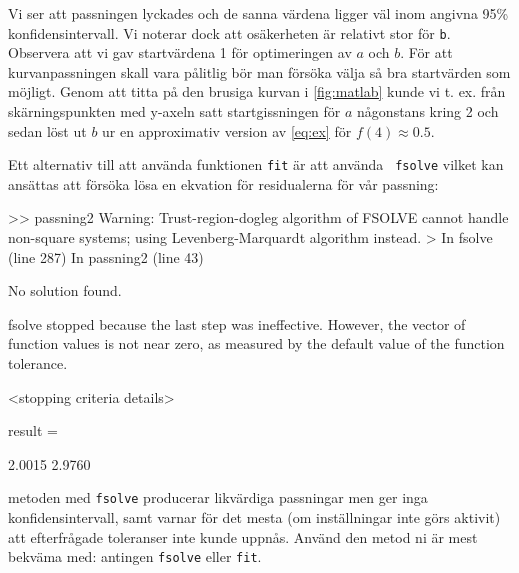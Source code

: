 Vi ser att passningen lyckades och de sanna värdena ligger väl inom
angivna 95\%  konfidensintervall. Vi noterar dock att osäkerheten är
relativt stor för {\tt b}. Observera att vi gav startvärdena 1 för
optimeringen av $a$ och $b$. För att kurvanpassningen skall vara pålitlig
bör man försöka välja så bra startvärden som möjligt. Genom att titta på
den brusiga kurvan i \cref{fig:matlab} kunde vi t. ex. från
skärningspunkten med y-axeln satt startgissningen för $a$ någonstans
kring 2 och sedan löst ut $b$ ur en approximativ version av \cref{eq:ex} för
$f(4) \approx 0.5$.

Ett alternativ till att använda funktionen {\tt fit} är att använda {\tt
  fsolve} vilket kan ansättas att försöka lösa en ekvation för
residualerna för vår passning:


\begin{terminaloutput}
>> passning2
Warning: Trust-region-dogleg algorithm of FSOLVE cannot handle non-square systems; using Levenberg-Marquardt algorithm instead. 
> In fsolve (line 287)
  In passning2 (line 43) 

No solution found.

fsolve stopped because the last step was ineffective. However, the vector of function
values is not near zero, as measured by the default value of the function tolerance. 

<stopping criteria details>


result =

    2.0015    2.9760
\end{terminaloutput}

metoden med {\tt fsolve} producerar likvärdiga passningar men ger
inga konfidensintervall, samt varnar för det mesta (om inställningar inte
görs aktivit) att efterfrågade toleranser inte kunde uppnås. Använd den
metod ni är mest bekväma med: antingen {\tt fsolve} eller {\tt fit}.